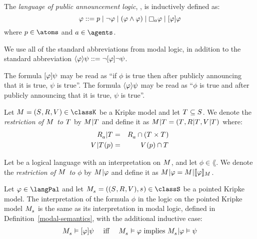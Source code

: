 \begin{definition}
The {\em language of public announcement logic}, \langPal{}, is inductively defined as:
$$
\phi ::= 
    \atomP \mid
    \lnot \phi \mid
    (\phi \land \phi) \mid
    \necessary[\agentA] \phi \mid
    \announceA{\phi} \phi
$$
where $\atomP \in \atoms$ and $\agentA \in \agents$.
\end{definition}

We use all of the standard abbreviations from modal logic, in addition to the standard abbreviation $\langle \varphi \rangle \psi ::= \lnot [ \varphi ] \lnot \psi$.

The formula $[ \varphi ] \psi$ may be read as ``if $\phi$ is true then after publicly announcing that it is true, $\psi$ is true''.
The formula $\langle \varphi \rangle \psi$ may be read as ``$\phi$ is true and after publicly announcing that it is true, $\psi$ is true''.

\begin{definition}
Let $\modelAndTuple \in \classK$ be a Kripke model and let $\statesT \subseteq \states$.
We denote the {\em restriction of $\model$ to $\statesT$} by $\restrict{\model}{\statesT}$ and
define it as $\restrict{\model}{\statesT} = (\statesT, \restrict{\accessibilityRel}{\statesT}, \restrict{\valuation}{\statesT})$ where:
\begin{eqnarray*}
    \restrict{\accessibility{\agentA}}{\statesT} &=& \accessibility{\agentA} \cap (\statesT \times \statesT)\\
    \restrict{\valuation}{\statesT}(\atomP) &=& \valuation(\atomP) \cap \statesT
\end{eqnarray*}

Let \lang{} be a logical language with an interpretation on $\model$, and let $\phi \in \lang$.
We denote the {\em restriction of $\model$ to $\phi$} by $\restrict{\model}{\phi}$ and define it as $\restrict{\model}{\phi} = \restrict{\model}{\interpretation[\model]{\phi}}$.
\end{definition}

\begin{definition}
Let $\phi \in \langPal$ and let $\pointedModelAndTuple{\stateS} \in \classS$ be a pointed Kripke model.
The interpretation of the formula $\phi$ in the logic \logicPalS{} on the pointed Kripke model $\pointedModel{\stateS}$ is the same as its interpretation in modal logic, defined in Definition~\ref{modal-semantics}, with the additional inductive case:
$$
\begin{array}{lcl}
\pointedModel{\stateS} \entails \announceA{\phi} \psi & \text{ iff } & \pointedModel{\stateS} \entails \phi \text{ implies } \restrict{\pointedModel{\stateS}}{\phi} \entails \psi
\end{array}
$$
\end{definition}

